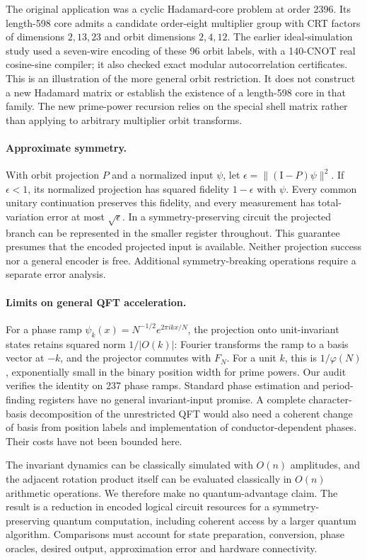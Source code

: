\documentclass[11pt]{article}
\newcommand{\id}{\mathrm{I}}
\begin{document}
The original application was a cyclic Hadamard-core problem at order 2396. Its length-598 core admits a candidate order-eight multiplier group with CRT factors of dimensions $2,13,23$ and orbit dimensions $2,4,12$. The earlier ideal-simulation study used a seven-wire encoding of these 96 orbit labels, with a 140-CNOT real cosine-sine compiler; it also checked exact modular autocorrelation certificates. This is an illustration of the more general orbit restriction. It does not construct a new Hadamard matrix or establish the existence of a length-598 core in that family. The new prime-power recursion relies on the special shell matrix rather than applying to arbitrary multiplier orbit transforms.

\paragraph{Approximate symmetry.} With orbit projection $P$ and a normalized input $\psi$, let $\epsilon=\|(\id-P)\psi\|^2$. If $\epsilon<1$, its normalized projection has squared fidelity $1-\epsilon$ with $\psi$. Every common unitary continuation preserves this fidelity, and every measurement has total-variation error at most $\sqrt\epsilon$. In a symmetry-preserving circuit the projected branch can be represented in the smaller register throughout. This guarantee presumes that the encoded projected input is available. Neither projection success nor a general encoder is free. Additional symmetry-breaking operations require a separate error analysis.

\paragraph{Limits on general QFT acceleration.} For a phase ramp $\psi_k(x)=N^{-1/2}e^{2\pi i kx/N}$, the projection onto unit-invariant states retains squared norm $1/|O(k)|$: Fourier transforms the ramp to a basis vector at $-k$, and the projector commutes with $F_N$. For a unit $k$, this is $1/\varphi(N)$, exponentially small in the binary position width for prime powers. Our audit verifies the identity on 237 phase ramps. Standard phase estimation and period-finding registers have no general invariant-input promise. A complete character-basis decomposition of the unrestricted QFT would also need a coherent change of basis from position labels and implementation of conductor-dependent phases. Their costs have not been bounded here.

The invariant dynamics can be classically simulated with $O(n)$ amplitudes, and the adjacent rotation product itself can be evaluated classically in $O(n)$ arithmetic operations. We therefore make no quantum-advantage claim. The result is a reduction in encoded logical circuit resources for a symmetry-preserving quantum computation, including coherent access by a larger quantum algorithm. Comparisons must account for state preparation, conversion, phase oracles, desired output, approximation error and hardware connectivity.
\end{document}
